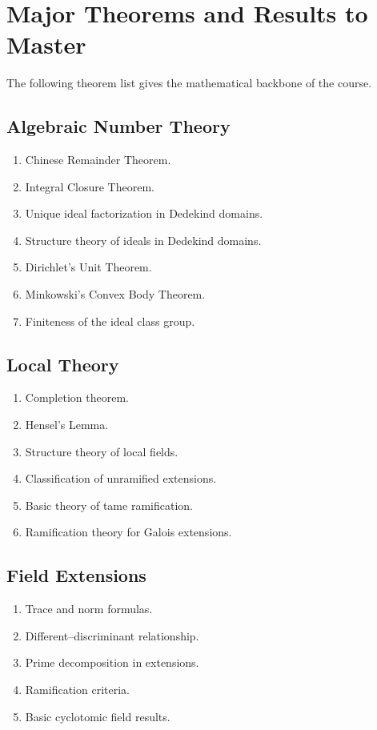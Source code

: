 \documentclass[11pt,a4paper]{article}
\begin{document}
\section{Major Theorems and Results to Master}

The following theorem list gives the mathematical backbone of the
course.

\subsection{Algebraic Number Theory}

\begin{enumerate}
    \item Chinese Remainder Theorem.
    \item Integral Closure Theorem.
    \item Unique ideal factorization in Dedekind domains.
    \item Structure theory of ideals in Dedekind domains.
    \item Dirichlet's Unit Theorem.
    \item Minkowski's Convex Body Theorem.
    \item Finiteness of the ideal class group.
\end{enumerate}

\subsection{Local Theory}

\begin{enumerate}
    \item Completion theorem.
    \item Hensel's Lemma.
    \item Structure theory of local fields.
    \item Classification of unramified extensions.
    \item Basic theory of tame ramification.
    \item Ramification theory for Galois extensions.
\end{enumerate}

\subsection{Field Extensions}

\begin{enumerate}
    \item Trace and norm formulas.
    \item Different--discriminant relationship.
    \item Prime decomposition in extensions.
    \item Ramification criteria.
    \item Basic cyclotomic field results.
\end{enumerate}
\end{document}
